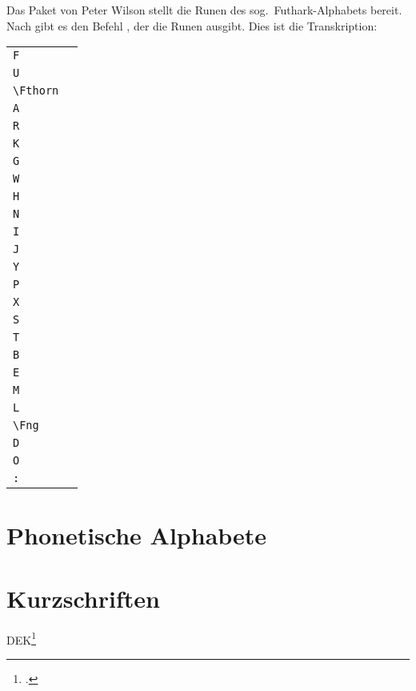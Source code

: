 Das Paket  von Peter Wilson stellt die Runen des sog.\ Futhark-Alphabets bereit.
Nach  gibt es den Befehl , der
die Runen ausgibt. Dies ist die Transkription:

\begin{center}
\begin{tabular}{ll}
 \lstinline/F/ &	\textfut{F} \\
 \lstinline/U/ &	\textfut{U} \\
 \lstinline/\Fthorn/ &	\textfut{\Fthorn} \\
 \lstinline/A/ &	\textfut{A} \\
 \lstinline/R/ &	\textfut{R} \\
 \lstinline/K/ &	\textfut{K} \\
 \lstinline/G/ &	\textfut{G} \\
 \lstinline/W/ &	\textfut{W} \\
 \lstinline/H/ &	\textfut{H} \\
 \lstinline/N/ &	\textfut{N} \\
 \lstinline/I/ &	\textfut{I} \\
 \lstinline/J/ &	\textfut{J} \\
 \lstinline/Y/ &	\textfut{Y} \\
 \lstinline/P/ &	\textfut{P} \\
 \lstinline/X/ &	\textfut{X} \\
 \lstinline/S/ &	\textfut{S} \\
 \lstinline/T/ &	\textfut{T} \\
 \lstinline/B/ &	\textfut{B} \\
 \lstinline/E/ &	\textfut{E} \\
 \lstinline/M/ &	\textfut{M} \\
 \lstinline/L/ &	\textfut{L} \\
 \lstinline/\Fng/ &	\textfut{\Fng} \\
 \lstinline/D/ &	\textfut{D} \\
 \lstinline/O/ &	\textfut{O} \\
 \lstinline/:/ &	\textfut{:} \\
 \end{tabular}
 \end{center}


\section{Phonetische Alphabete}


\section{Kurzschriften}



DEK\footcite{sarman:dtk2009/1}


